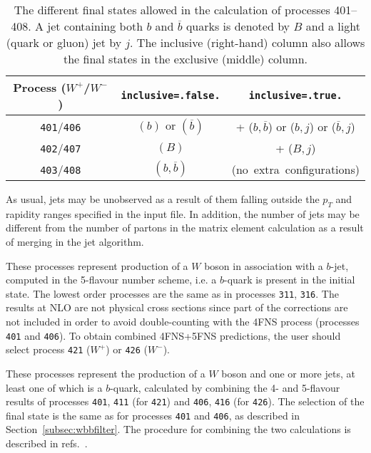 \begin{table}
\begin{center}
\begin{tabular}{|c|c|c|} \hline
 Process ($W^+$/$W^-$) & {\tt inclusive=.false.} & {\tt inclusive=.true.} \\
\hline
{\tt 401}/{\tt 406} & $(b)$ or $(\overline b)$ & + ($b,\overline b$) or ($b,j$) or ($\overline b,j$) \\
{\tt 402}/{\tt 407} & $(B)$ & + ($B,j$) \\
{\tt 403}/{\tt 408} & $(b,\overline b)$ & \mbox{(no extra configurations)} \\
\hline
\end{tabular}
\caption{The different final states allowed in the calculation of processes 401--408. A jet containing
both $b$ and $\overline b$ quarks is denoted by $B$ and a light (quark or gluon) jet by $j$. The inclusive
(right-hand) column also allows the final states in the exclusive (middle) column.}
\label{table:wbbfilter}
\end{center}
\end{table}

As usual, jets may be unobserved as a result of them falling outside the $p_T$
and rapidity ranges specified in the input file. In addition, the number of jets
may be different from the number of partons in the matrix element calculation as
a result of merging in the jet algorithm.

%
\label{subsec:wb5FNS}

These processes represent production of a $W$ boson in association with a
$b$-jet, computed in the 5-flavour number scheme, i.e. a $b$-quark is present in
the initial state. The lowest order processes are the same as in processes {\tt 311}, {\tt 316}.
The results at NLO are not physical cross sections since part of the corrections
are not included in order to avoid double-counting with the 4FNS process (processes
{\tt 401} and {\tt 406}). To obtain combined 4FNS+5FNS predictions, the user
should select process {\tt 421} ($W^+$) or {\tt 426} ($W^-$).

\label{subsec:wbcombined}
These processes represent the production of a $W$ boson and one or more jets,
at least one of which is a $b$-quark, calculated by combining the 4- and 5-flavour results
of processes {\tt 401}, {\tt 411} (for {\tt 421}) and {\tt 406}, {\tt 416} (for {\tt 426}).
The selection of the final state is the same as for processes {\tt 401} and {\tt 406}, as
described in Section~\ref{subsec:wbbfilter}. The procedure for combining the two
calculations is described in refs.~\cite{Campbell:2008hh,Caola:2011pz}.

